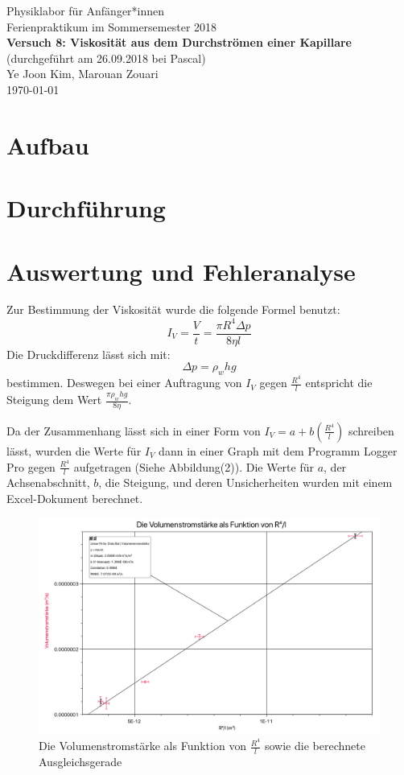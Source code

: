 \documentclass[11pt,a4paper]{article}
\begin{document}
	

{
	\centering 
	\large 
	Physiklabor für Anfänger*innen \\
	Ferienpraktikum im Sommersemester 2018 \\[4mm]
	\textbf{\LARGE 
		Versuch 8: Viskosität aus dem Durchströmen einer Kapillare
	} \\[3mm]
	(durchgeführt am 26.09.2018 bei Pascal) \\
	Ye Joon Kim, Marouan Zouari\\
	\today \\[10mm]
}
\tableofcontents

\section{Aufbau}


\section{Durchführung}

\section{Auswertung und Fehleranalyse}
Zur Bestimmung der Viskosität wurde die folgende Formel benutzt:
\begin{equation}
	I_V = \frac{V}{t} = \frac{\pi R^4 \Delta p}{8 \eta l}
\end{equation}
Die Druckdifferenz lässt sich mit:
$$\Delta p = \rho_w hg$$
bestimmen. Deswegen bei einer Auftragung von $I_V$ gegen $\frac{R^4}{l}$ entspricht die Steigung dem Wert $\frac{ \pi \rho_w hg}{8\eta}$.

Da der Zusammenhang lässt sich in einer Form von $I_V = a + b(\frac{R^4}{l})$ schreiben lässt, wurden die Werte für $I_V$ dann in einer Graph mit dem Programm Logger Pro gegen $\frac{R^4}{l}$ aufgetragen (Siehe Abbildung(2)). Die Werte für $a$, der Achsenabschnitt, $b$, die Steigung, und deren Unsicherheiten wurden mit einem Excel-Dokument berechnet. 

\begin{figure}
	\centering
	\includegraphics[width=\linewidth]{Abb2}
	\caption{Die Volumenstromstärke als Funktion von $\frac{R^4}{l}$ sowie die berechnete Ausgleichsgerade}
\end{figure}
\end{document}
